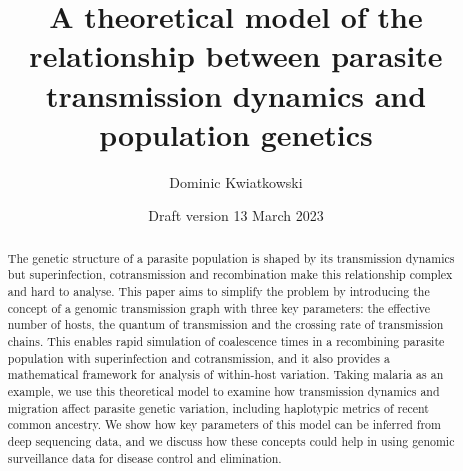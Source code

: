 \documentclass[hidelinks,10pt]{article}
\title{A theoretical model of the relationship between parasite transmission dynamics and population genetics}
\date{Draft version 13 March 2023}
\author{Dominic Kwiatkowski}
\begin{document}
\maketitle

\begin{abstract}

The genetic structure of a parasite population is shaped by its transmission dynamics but superinfection, cotransmission and recombination make this relationship complex and hard to analyse.  This paper aims to simplify the problem by introducing the concept of a genomic transmission graph with three key parameters: the effective number of hosts, the quantum of transmission and the crossing rate of transmission chains.  This enables rapid simulation of coalescence times in a recombining parasite population with superinfection and cotransmission, and it also provides a mathematical framework for analysis of within-host variation. Taking malaria as an example, we use this theoretical model to examine how transmission dynamics and migration affect parasite genetic variation, including haplotypic metrics of recent common ancestry.  We show how key parameters of this model can be inferred from deep sequencing data, and we discuss how these concepts could help in using genomic surveillance data for disease control and elimination. 


\end{abstract}

\end{document}
